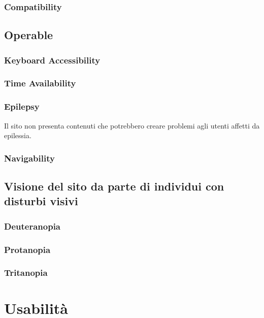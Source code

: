 \documentclass[10pt, a4paper]{article}
\begin{document}
\subsubsection{Compatibility}

\subsection{Operable}

\subsubsection{Keyboard Accessibility}

\subsubsection{Time Availability}

\subsubsection{Epilepsy}
Il sito non presenta contenuti che potrebbero creare problemi agli utenti affetti da epilessia.

\subsubsection{Navigability}

\subsection{Visione del sito da parte di individui con disturbi visivi}

\subsubsection{Deuteranopia}

\subsubsection{Protanopia}

\subsubsection{Tritanopia}

\section{Usabilità}
\end{document}
